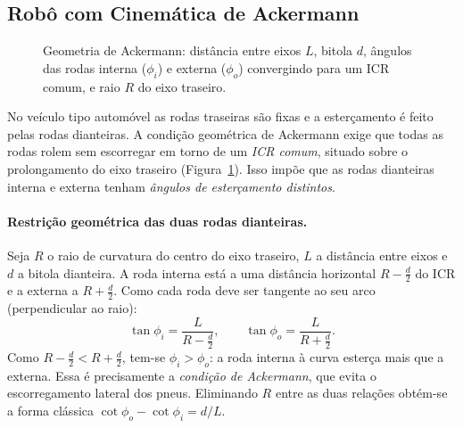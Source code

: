 \documentclass[11pt,a4paper]{article}
\begin{document}
\subsection{Robô com Cinemática de Ackermann}

\begin{figure}[H]
  \centering
  \resizebox{0.72\textwidth}{!}{}
  \caption{Geometria de Ackermann: distância entre eixos $L$, bitola $d$,
  ângulos das rodas interna ($\phi_i$) e externa ($\phi_o$) convergindo para
  um ICR comum, e raio $R$ do eixo traseiro.}
  \label{fig:ackermann-geo}
\end{figure}

No veículo tipo automóvel as rodas traseiras são fixas e a esterçamento é
feito pelas rodas dianteiras. A condição geométrica de Ackermann exige que
todas as rodas rolem sem escorregar em torno de um \emph{ICR comum}, situado
sobre o prolongamento do eixo traseiro (Figura~\ref{fig:ackermann-geo}).
Isso impõe que as rodas dianteiras interna e externa tenham \emph{ângulos de
esterçamento distintos}.

\paragraph{Restrição geométrica das duas rodas dianteiras.}
Seja $R$ o raio de curvatura do centro do eixo traseiro, $L$ a distância
entre eixos e $d$ a bitola dianteira. A roda interna está a uma distância
horizontal $R-\tfrac{d}{2}$ do ICR e a externa a $R+\tfrac{d}{2}$. Como
cada roda deve ser tangente ao seu arco (perpendicular ao raio):
\begin{equation}
  \tan\phi_i = \frac{L}{R - \tfrac{d}{2}}, \qquad
  \tan\phi_o = \frac{L}{R + \tfrac{d}{2}}.
  \label{eq:ack-inner-outer}
\end{equation}
Como $R-\tfrac{d}{2} < R+\tfrac{d}{2}$, tem-se $\phi_i > \phi_o$: a roda
interna à curva esterça mais que a externa. Essa é precisamente a
\emph{condição de Ackermann}, que evita o escorregamento lateral dos pneus.
Eliminando $R$ entre as duas relações obtém-se a forma clássica
$\cot\phi_o - \cot\phi_i = d/L$.
\end{document}
